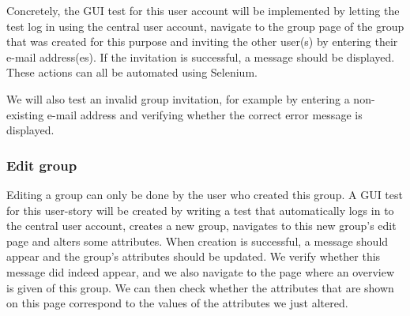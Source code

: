 \documentclass[10pt,a4paper,BCOR12mm, headexclude, footexclude,
  twoside, openright]{scrartcl}
\numberwithin{equation}{section} %
\numberwithin{figure}{section} %
\numberwithin{table}{section} %
\begin{document}
Concretely, the GUI test for this user account will be implemented by letting the test log in using the central user account, navigate to the group page of the group that was created for this purpose and inviting the other user(s) by entering their e-mail address(es).
If the invitation is successful, a message should be displayed.
These actions can all be automated using Selenium.

We will also test an invalid group invitation, for example by entering a non-existing e-mail address and verifying whether the correct error message is displayed.

\subsubsection*{Edit group}

Editing a group can only be done by the user who created this group.
A GUI test for this user-story will be created by writing a test that automatically logs in to the central user account, creates a new group, navigates to this new group's edit page and alters some attributes.
When creation is successful, a message should appear and the group's attributes should be updated.
We verify whether this message did indeed appear, and we also navigate to the page where an overview is given of this group.
We can then check whether the attributes that are shown on this page correspond to the values of the attributes we just altered.
\end{document}
